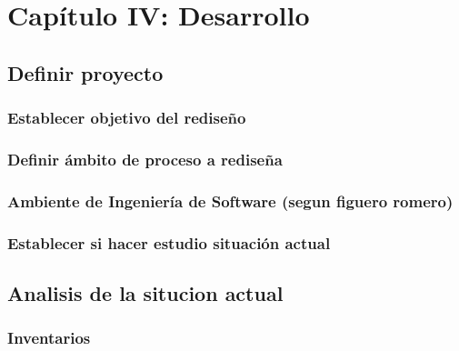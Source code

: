 \documentclass[11pt]{article}
\begin{document}
\newpage

\hypertarget{capuxedtulo-iv-desarrollo}{%
\section{Capítulo IV: Desarrollo}\label{capuxedtulo-iv-desarrollo}}

\hypertarget{definir-proyecto-1}{%
\subsection{Definir proyecto}\label{definir-proyecto-1}}

\hypertarget{establecer-objetivo-del-rediseuxf1o-1}{%
\subsubsection{Establecer objetivo del
rediseño}\label{establecer-objetivo-del-rediseuxf1o-1}}

\hypertarget{definir-uxe1mbito-de-proceso-a-rediseuxf1a}{%
\subsubsection{Definir ámbito de proceso a
rediseña}\label{definir-uxe1mbito-de-proceso-a-rediseuxf1a}}

\hypertarget{ambiente-de-ingenieruxeda-de-software-segun-figuero-romero}{%
\subsubsection{Ambiente de Ingeniería de Software (segun figuero
romero)}\label{ambiente-de-ingenieruxeda-de-software-segun-figuero-romero}}

\hypertarget{establecer-si-hacer-estudio-situaciuxf3n-actual-1}{%
\subsubsection{Establecer si hacer estudio situación
actual}\label{establecer-si-hacer-estudio-situaciuxf3n-actual-1}}

\hypertarget{analisis-de-la-situcion-actual}{%
\subsection{Analisis de la situcion
actual}\label{analisis-de-la-situcion-actual}}

\hypertarget{inventarios}{%
\subsubsection{Inventarios}\label{inventarios}}
\end{document}
